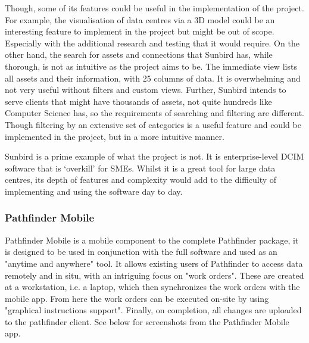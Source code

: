 \documentclass [11pt,a4paper]{article}
\begin{document}
Though, some of its features could be useful in the implementation of the project. For example, the visualisation of data centres via a 3D model could be an interesting feature to implement in the project but might be out of scope. Especially with the additional research and testing that it would require. On the other hand, the search for assets and connections that Sunbird has, while thorough, is not as intuitive as the project aims to be. The immediate view lists all assets and their information, with 25 columns of data. It is overwhelming and not very useful without filters and custom views. Further, Sunbird intends to serve clients that might have thousands of assets, not quite hundreds like Computer Science has, so the requirements of searching and filtering are different. Though filtering by an extensive set of categories is a useful feature and could be implemented in the project, but in a more intuitive manner. 

Sunbird is a prime example of what the project is not. It is enterprise-level DCIM software that is `overkill' for SMEs. Whilst it is a great tool for large data centres, its depth of features and complexity would add to the difficulty of implementing and using the software day to day.

\subsubsection{Pathfinder Mobile}
\label{sec:pathfinder}

Pathfinder Mobile is a mobile component to the complete Pathfinder package, it is designed to be used in conjunction with the full software and used as an "anytime and anywhere" \cite{PathfinderMobile} tool. It allows existing users of Pathfinder to access data remotely and in situ, with an intriguing focus on "work orders". These are created at a workstation, i.e. a laptop, which then synchronizes the work orders with the mobile app. From here the work orders can be executed on-site by using "graphical instructions support"\cite{Pathfinder}. Finally, on completion, all changes are uploaded to the pathfinder client. See below for screenshots from the Pathfinder Mobile app. 
\end{document}
